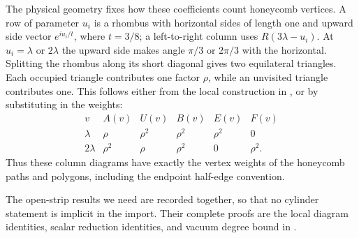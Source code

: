 The physical geometry fixes how these coefficients count honeycomb
vertices. A row of parameter $u_i$ is a rhombus with horizontal sides
of length one and upward side vector $e^{iu_i/t}$, where $t=3/8$;
a left-to-right column uses $R(3\lambda-u_i)$. At
$u_i=\lambda$ or $2\lambda$ the upward side makes angle $\pi/3$ or
$2\pi/3$ with the horizontal. Splitting the rhombus along its short
diagonal gives two equilateral triangles. Each occupied triangle
contributes one factor $\rho$, while an unvisited triangle contributes
one. This follows either from the local construction in
\cite[Section 2]{StripCompanion}, or by substituting in the weights:
\[
\begin{array}{c|ccccc}
 v&A(v)&U(v)&B(v)&E(v)&F(v)\\\hline
 \lambda&\rho&\rho^2&\rho^2&\rho^2&0\\
 2\lambda&\rho^2&\rho&\rho^2&0&\rho^2.
\end{array}
\]
Thus these column diagrams have exactly the vertex weights of the
honeycomb paths and polygons, including the endpoint half-edge convention.

The open-strip results we need are recorded together, so that no
cylinder statement is implicit in the import. Their complete proofs
are the local diagram identities, scalar reduction identities, and
vacuum degree bound in \cite[Lemmas 2.2, 3.1, 3.2]{StripCompanion}.

